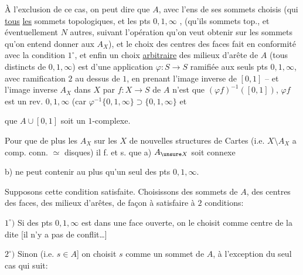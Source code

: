 À l'exclusion de ce cas, on peut dire
que $A$, avec l'ens de ses sommets
choisis (qui   \uline{tous} \uline{les} sommets
topologiques, et les pts $0,1,\infty$ , (qu'ils
 sommets top., et éventuellement
$N$ autres,  suivant l'opération
qu'on veut obtenir sur les sommets
qu'on entend donner aux $A_X$), et
le choix des centres des faces fait
en conformité avec la condition $1^\circ$,
et enfin un choix \uline{arbitraire} des
milieux d'arête de $A$ (tous distincts
 de $0,1,\infty$) est  d'une
application $\varphi:S\to S$ ramifiée aux
seuls pts $0,1,\infty$, avec ramification
$2$ au dessus de $1$, en prenant l'image
inverse de $[0,1]$ -- et l'image inverse
 $A_X$ dans $X$ par $f:X\to S$ de
$A$ n'est que $(\varphi f)^{-1}([0,1])$,
 $\varphi f$ est  un rev. 
$0,1,\infty$ (car $\varphi^{-1}\{0,1,\infty\}\supset\{0,1,\infty\}$ et

que $A\cup[0,1]$ soit un $1$-complexe.

Pour que de plus les $A_X$ 
sur les $X$ de nouvelles structures de
Cartes (i.e. $X\setminus A_X$ a comp. conn. $\simeq$ disques)
il f. et s. que a) $A_{\unsure X}$ soit connexe
\par
{}\par
{}\par
{}\par
{}

b)    
ne peut contenir au plus qu'un seul
des pts $0,1,\infty$.

Supposons cette condition satisfaite. Choisissons
des sommets de $A$,  des centres des
faces, des milieux d'arêtes, de façon
à satisfaire à $2$ conditions:

$1^\circ)$ Si  des pts $0,1,\infty$ est dans une
face ouverte, on le choisit comme
centre de la dite [il n'y a pas de conflit\ldots]

$2^\circ)$ Sinon (i.e.  $s\in A$] on choisit $s$
comme un sommet de $A$,  à l'exception
du seul cas qui suit:


